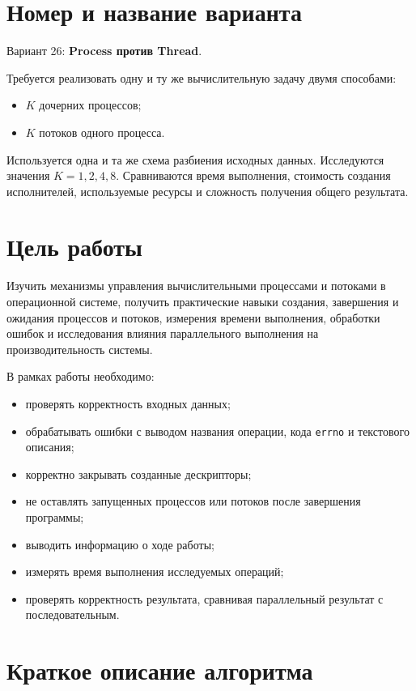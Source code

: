 \newpage
\section{Номер и название варианта}

Вариант 26: \textbf{Process против Thread}.

Требуется реализовать одну и ту же вычислительную задачу двумя способами:
\begin{itemize}
    \item \(K\) дочерних процессов;
    \item \(K\) потоков одного процесса.
\end{itemize}

Используется одна и та же схема разбиения исходных данных. Исследуются значения
\(K = 1, 2, 4, 8\). Сравниваются время выполнения, стоимость создания исполнителей,
используемые ресурсы и сложность получения общего результата.

\newpage
\section{Цель работы}

Изучить механизмы управления вычислительными процессами и потоками в операционной
системе, получить практические навыки создания, завершения и ожидания процессов и
потоков, измерения времени выполнения, обработки ошибок и исследования влияния
параллельного выполнения на производительность системы.

В рамках работы необходимо:
\begin{itemize}
    \item проверять корректность входных данных;
    \item обрабатывать ошибки с выводом названия операции, кода \texttt{errno} и текстового описания;
    \item корректно закрывать созданные дескрипторы;
    \item не оставлять запущенных процессов или потоков после завершения программы;
    \item выводить информацию о ходе работы;
    \item измерять время выполнения исследуемых операций;
    \item проверять корректность результата, сравнивая параллельный результат с последовательным.
\end{itemize}

\newpage
\section{Краткое описание алгоритма}

